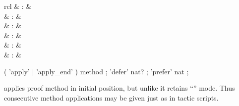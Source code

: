 \begin{isabellebody}
\begin{isamarkuptext}
  \begin{matharray}{rcl}
    \hypertarget{command.apply}{\hyperlink{command.apply}{\mbox{}}}\isa{{\isachardoublequote}\isactrlsup {\isacharasterisk}{\isachardoublequote}} & : &  \\
    \hypertarget{command.apply-end}{\hyperlink{command.apply-end}{\mbox{}}}\isa{{\isachardoublequote}\isactrlsup {\isacharasterisk}{\isachardoublequote}} & : &  \\
    \hypertarget{command.done}{\hyperlink{command.done}{\mbox{}}}\isa{{\isachardoublequote}\isactrlsup {\isacharasterisk}{\isachardoublequote}} & : &  \\
    \hypertarget{command.defer}{\hyperlink{command.defer}{\mbox{}}}\isa{{\isachardoublequote}\isactrlsup {\isacharasterisk}{\isachardoublequote}} & : &  \\
    \hypertarget{command.prefer}{\hyperlink{command.prefer}{\mbox{}}}\isa{{\isachardoublequote}\isactrlsup {\isacharasterisk}{\isachardoublequote}} & : &  \\
    \hypertarget{command.back}{\hyperlink{command.back}{\mbox{}}}\isa{{\isachardoublequote}\isactrlsup {\isacharasterisk}{\isachardoublequote}} & : &  \\
  \end{matharray}

  \begin{rail}
    ( 'apply' | 'apply\_end' ) method
    ;
    'defer' nat?
    ;
    'prefer' nat
    ;
  \end{rail}

  \begin{descr}

  \item [\hyperlink{command.apply}{\mbox{\isa{\isacommand{apply}}}}~\isa{m}] applies proof method 
  in initial position, but unlike \hyperlink{command.proof}{\mbox{}} it retains
  ``'' mode.  Thus consecutive method
  applications may be given just as in tactic scripts.
  

\end{descr}
\end{isamarkuptext}
\end{isabellebody}
